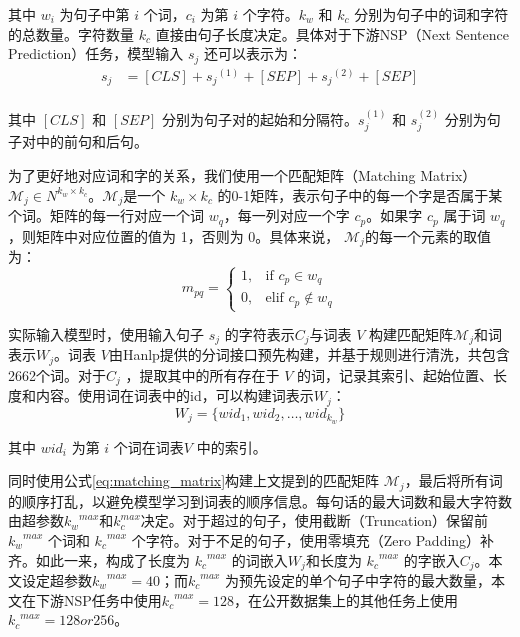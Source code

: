\documentclass[12pt, a4paper]{ctexart}
\begin{document}
其中 $w_i$ 为句子中第 $i$ 个词，$c_i$ 为第 $i$ 个字符。$k_w$ 和 $k_c$ 分别为句子中的词和字符的总数量。字符数量 $k_c$ 直接由句子长度决定。具体对于下游NSP（Next Sentence Prediction）任务，模型输入 $s_j$ 还可以表示为：
\begin{equation}
    \begin{split}
        s_j &= [CLS] + {s_j}^{(1)} + [SEP] + {s_j}^{(2)} + [SEP] \\
    \end{split}
\end{equation} 

其中 $[CLS]$ 和 $[SEP]$ 分别为句子对的起始和分隔符。$s_j^{(1)}$ 和 $s_j^{(2)}$ 分别为句子对中的前句和后句。

为了更好地对应词和字的关系，我们使用一个匹配矩阵（Matching Matrix）${\mathcal{M}}_j  \in N^{k_w \times k_c}$。${\mathcal{M}}_j$是一个 $k_w \times k_c$ 的0-1矩阵，表示句子中的每一个字是否属于某个词。矩阵的每一行对应一个词 $w_q$，每一列对应一个字 $c_p$。如果字 $c_p$ 属于词 $w_q$，则矩阵中对应位置的值为 1，否则为 0。具体来说，
$ {\mathcal{M}}_j$的每一个元素的取值为：
\begin{equation}
    m_{pq} = \begin{cases}
        1, & \text{if } c_p \in w_q \\
        0, & \text{elif } c_p \notin w_q
    \end{cases}
    \label{eq:matching_matrix}
\end{equation}

实际输入模型时，使用输入句子 $s_j$ 的字符表示$C_j$与词表 $V$ 构建匹配矩阵${\mathcal{M}}_j$和词表示$W_j$。词表 $V$由Hanlp提供的分词接口预先构建，并基于规则进行清洗，共包含2662个词。对于$C_j$ ，提取其中的所有存在于 $V$ 的词，记录其索引、起始位置、长度和内容。使用词在词表中的id，可以构建词表示$W_j$：
\begin{equation}
    W_j = \{wid_1, wid_2, \dots, wid_{k_w}\}
\end{equation}

其中 $wid_i$ 为第 $i$ 个词在词表$V$ 中的索引。

同时使用公式\ref{eq:matching_matrix}构建上文提到的匹配矩阵 ${\mathcal{M}}_j$，最后将所有词的顺序打乱，以避免模型学习到词表的顺序信息。每句话的最大词数和最大字符数由超参数${k_w}^{max}$和${k_c^{max}}$决定。对于超过的句子，使用截断（Truncation）保留前 ${k_w}^{max}$ 个词和 ${k_c}^{max}$ 个字符。对于不足的句子，使用零填充（Zero Padding）补齐。如此一来，构成了长度为 ${k_c}^{max}$ 的词嵌入$W_j$和长度为 ${k_c}^{max}$ 的字嵌入$C_j$。本文设定超参数${k_w}^{max}=40$；而${k_c}^{max}$ 为预先设定的单个句子中字符的最大数量，本文在下游NSP任务中使用${k_c}^{max}=128$，在公开数据集上的其他任务上使用${k_c}^{max}=128 or 256$。
\end{document}
